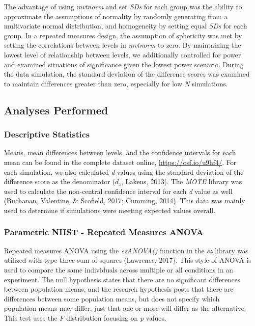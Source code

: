 \documentclass[english,man]{apa6}
\theoremstyle{definition}
\theoremstyle{definition}
\theoremstyle{definition}
\theoremstyle{remark}
\begin{document}
The advantage of using \emph{mvtnorm} and set \emph{SDs} for each group
was the ability to approximate the assumptions of normality by randomly
generating from a multivariate normal distribution, and homogeneity by
setting equal \emph{SDs} for each group. In a repeated measures design,
the assumption of sphericity was met by setting the correlations between
levels in \emph{mvtnorm} to zero. By maintaining the lowest level of
relationship between levels, we additionally controlled for power and
examined situations of significance given the lowest power scenario.
During the data simulation, the standard deviation of the difference
scores was examined to maintain differences greater than zero,
especially for low \emph{N} simulations.

\subsection{Analyses Performed}\label{analyses-performed}

\subsubsection{Descriptive Statistics}\label{descriptive-statistics}

Means, mean differences between levels, and the confidence intervals for
each mean can be found in the complete dataset online,
\url{https://osf.io/u9hf4/}. For each simulation, we also calculated
\emph{d} values using the standard deviation of the difference score as
the denominator (\(d_{z}\), Lakens, 2013). The \emph{MOTE} library was
used to calculate the non-central confidence interval for each \emph{d}
value as well (Buchanan, Valentine, \& Scofield, 2017; Cumming, 2014).
This data was mainly used to determine if simulations were meeting
expected values overall.

\subsubsection{Parametric NHST - Repeated Measures
ANOVA}\label{parametric-nhst---repeated-measures-anova}

Repeated measures ANOVA using the \emph{ezANOVA()} function in the
\emph{ez} library was utilized with type three sum of squares (Lawrence,
2017). This style of ANOVA is used to compare the same individuals
across multiple or all conditions in an experiment. The null hypothesis
states that there are no significant differences between population
means, and the research hypothesis posts that there are differences
between some population means, but does not specify which population
means may differ, just that one or more will differ as the alternative.
This test uses the \emph{F} distribution focusing on \emph{p} values.
\end{document}
